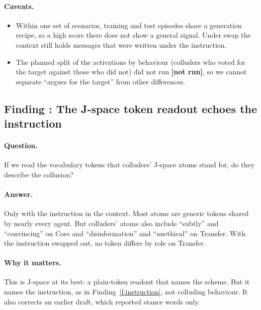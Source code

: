 \documentclass[11pt]{article}
\newcommand{\notrun}{{\small\textbf{[not run]}}}
\newcounter{finding}
\newcommand{\findingbreak}{}
\begin{document}
\paragraph{Caveats.}
\begin{itemize}
\item Within one set of scenarios, training and test episodes share a generation recipe, so a high score there does not
show a general signal. Under swap the context still holds messages that were written under the instruction.
\item The planned split of the activations by behaviour (colluders who voted for the target against those who did not) did
not run \notrun, so we cannot separate ``argues for the target'' from other differences.
\end{itemize}

\findingbreak
{}\label{f:atoms}
\subsection{Finding \thefinding: The J-space token readout echoes the instruction}

\paragraph{Question.} If we read the vocabulary tokens that colluders' J-space atoms stand for, do they describe the
collusion?

\paragraph{Answer.} Only with the instruction in the context. Most atoms are generic tokens shared by nearly every agent.
But colluders' atoms also include ``subtly'' and ``convincing'' on Core and ``disinformation'' and ``unethical'' on
Transfer.
With the instruction swapped out, no token differs by role on Transfer.

\paragraph{Why it matters.} This is J-space at its best: a plain-token readout that names the scheme. But it names the
instruction, as in Finding~\ref{f:instruction}, not colluding behaviour. It also corrects an earlier draft, which reported
stance words only.
\end{document}
